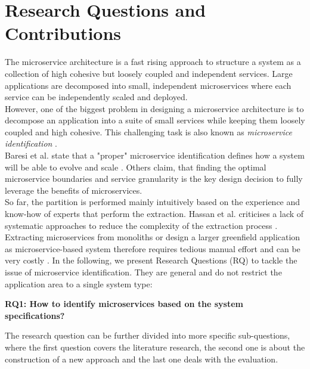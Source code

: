 \section{Research Questions and Contributions}
\label{sec:Introduction:ResearchQuestions}
The microservice architecture is a fast rising approach to structure a system as a collection of high cohesive but loosely coupled and independent services. Large applications are decomposed into small, independent microservices where each service can be independently scaled and deployed. 
\\
However, one of the biggest problem in designing a microservice architecture is to decompose an application into a suite of small services while keeping them loosely coupled and high cohesive. This challenging task is also known as \textit{microservice identification} \cite{ObjectAwareAmiri}. \\
Baresi et al. state that a "proper" microservice identification defines how a system will be able to evolve and scale \cite{interfaceAnalysisBaresi}. Others claim, that finding the optimal microservice boundaries \cite{ClassificationOfRefactoring} and service granularity  \cite{ArchitecturalMetaModelling} is the key design decision to fully leverage the benefits of microservices. 
\\
So far, the partition is performed mainly intuitively based on the experience and know-how of experts that perform the extraction. Hassan et al. criticises a lack of systematic approaches to reduce the complexity of the extraction process \cite{ArchitecturalMetaModelling}. Extracting microservices from monoliths or design a larger greenfield application as microservice-based system therefore requires tedious manual effort and can be very costly \cite{FunctionalDecompositionHeinrich} \cite{ExtractionMazlami}. In the following, we present Research Questions (RQ) to tackle the issue of microservice identification. They are general and do not restrict the application area to a single system type:


\vspace{1cm}
\par
\begingroup
\leftskip=1cm
\rightskip=1cm

\noindent
\textbf{RQ1: How to identify microservices based on the system specifications?}

\vspace{0.5cm}
\noindent
The research question can be further divided into more specific sub-questions, where the first question covers the literature research, the second one is about the construction of a new approach and the last one deals with the evaluation.

